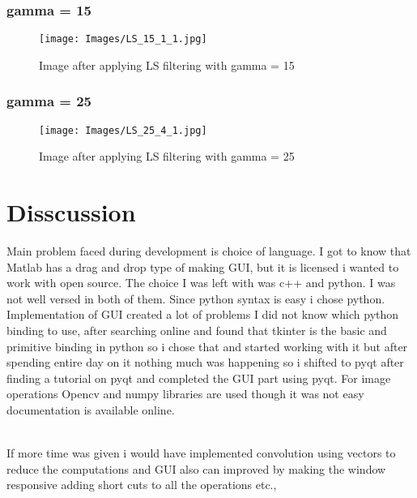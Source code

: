 \documentclass{article}
\begin{document}
\subsubsection[!Hp]{gamma = 15}
\begin{figure}[!Hp]

\begin{minipage}[!b]{1.0\linewidth}
  \centering
  \centerline{\texttt{[image: Images/LS\_15\_1\_1.jpg]}}
  \centerline{Image after applying LS filtering with gamma = 15}\medskip
\end{minipage}
%
\end{figure}
\subsubsection[!Hp]{gamma = 25}
\begin{figure}[!Hp]

\begin{minipage}[!b]{1.0\linewidth}
  \centering
  \centerline{\texttt{[image: Images/LS\_25\_4\_1.jpg]}}
  \centerline{Image after applying LS filtering with gamma = 25}\medskip
\end{minipage}
%
\end{figure}


\section{Disscussion}
\label{sec:ref}

Main problem faced during development is choice of language. I got to know that Matlab has a drag and drop type of making GUI, but it is licensed i wanted to work with open source. The choice I was left with was c++ and python. I was not well versed in both of them. Since python syntax is easy i chose python. Implementation of  GUI created a lot of problems I did not know which python binding to use, after searching online and found that tkinter is the basic and primitive binding in python so i chose that and started working with it but after spending entire day on it nothing much was happening so i shifted to pyqt after finding a tutorial\cite{WEBSITE:9} on pyqt and completed the GUI part using pyqt. For image operations Opencv \cite{WEBSITE:3}and numpy\cite{WEBSITE:1} libraries are used though it was not easy documentation is available online.

\\ If more time was given i would have implemented convolution using vectors to reduce the computations and GUI also can improved by  making the window responsive adding short cuts to all the operations etc.,
\end{document}
